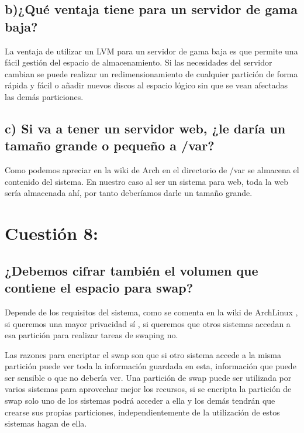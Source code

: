 \subsection{b)¿Qué ventaja tiene para un servidor de gama baja?}
La ventaja de utilizar un LVM para un servidor de gama baja es que permite una fácil gestión del espacio de almacenamiento.
Si las necesidades del servidor cambian se puede realizar un redimensionamiento de cualquier partición de forma rápida y fácil o
añadir nuevos discos al espacio lógico sin que se vean afectadas las demás particiones.

\subsection{c) Si va a tener un servidor web, ¿le daría un tamaño grande o pequeño a /var?}
Como podemos apreciar en la wiki de Arch\cite{DirectorioVar} en el directorio de /var se almacena el contenido del sistema.
En nuestro caso al ser un sistema para web, toda la web sería almacenada ahí, por tanto deberíamos darle un tamaño grande.





\section{Cuestión 8:}
\subsection{¿Debemos cifrar también el volumen que contiene el espacio para swap?}
Depende de los requisitos del sistema, como se comenta en la wiki de ArchLinux \cite{EncriptarSwap}, si queremos una mayor privacidad
sí , si queremos que otros sistemas accedan a esa partición para realizar tareas de swaping no.

Las razones para encriptar el swap son que si otro sistema accede a la misma partición puede ver toda la información guardada en esta, 
 información que puede ser sensible o que no debería ver.
Una partición de swap puede ser utilizada por varios sistemas para aprovechar mejor los recursos, si se encripta la partición de swap
solo uno de los sistemas podrá acceder a ella y los demás tendrán que crearse sus propias particiones, independientemente de la utilización
de estos sistemas hagan de ella.

